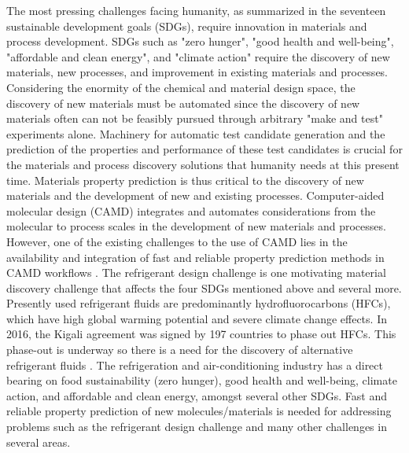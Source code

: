 \documentclass[journal=jacsat,manuscript=article]{achemso}
\begin{document}
The most pressing challenges facing humanity, as summarized in the seventeen sustainable development goals (SDGs), require innovation in materials and process development. 
SDGs such as "zero hunger", "good health and well-being", "affordable and clean energy", and "climate action" \cite{unitednations17GOALSSustainable2015} require the discovery of new materials, new processes, and improvement in existing materials and processes.  
Considering the enormity of the chemical and material design space, the discovery of new materials must be automated since the discovery of new materials often can not be feasibly pursued through arbitrary "make and test" experiments alone. 
Machinery for automatic test candidate generation and the prediction of the properties and performance of these test candidates is crucial for the materials and process discovery solutions that humanity needs at this present time.
Materials property prediction is thus critical to the discovery of new materials and the development of new and existing processes. 
Computer-aided molecular design (CAMD) integrates and automates considerations from the molecular to process scales in the development of new materials and processes. 
However, one of the existing challenges to the use of CAMD lies in the availability and integration of fast and reliable property prediction methods in CAMD workflows \cite{adjimanProcessSystemsEngineering2021}.
The refrigerant design challenge is one motivating material discovery challenge that affects the four SDGs mentioned above and several more. 
Presently used refrigerant fluids are predominantly hydrofluorocarbons (HFCs), which have high global warming potential and severe climate change effects. In 2016, the Kigali agreement was signed by 197 countries to phase out HFCs. 
This phase-out is underway so there is a need for the discovery of alternative refrigerant fluids
\cite{departmentofecologystateofwashingtonHydrofluorocarbons2023, usaepaReducingHydrofluorocarbonHFC2014, davenportNationsFightingPowerful2016, mcgrathClimateChangeMonumental2016, veldersLargeContributionProjected2009}. 
The refrigeration and air-conditioning industry has a direct bearing on food sustainability (zero hunger), good health and well-being, climate action, and affordable and clean energy, amongst several other SDGs. 
Fast and reliable property prediction of new molecules/materials is needed for addressing problems such as the refrigerant design challenge and many other challenges in several areas.
\end{document}
